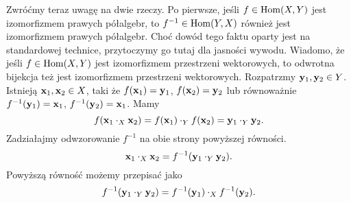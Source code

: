 \documentclass[a4paper,11pt]{article}
\begin{document}
Zwróćmy teraz uwagę na dwie rzeczy. Po pierwsze, jeśli $f \in \mathrm{Hom}( X, Y )$ jest izomorfizmem prawych półalgebr, to $f^{ -1 } \in \mathrm{Hom}( Y, X )$ również jest izomorfizmem prawych półalgebr. Choć dowód tego faktu oparty jest na standardowej technice, przytoczymy go tutaj dla jasności wywodu. Wiadomo, że jeśli $f \in \mathrm{Hom}( X, Y )$ jest izomorfizmem przestrzeni wektorowych, to odwrotna bijekcja też jest izomorfizmem przestrzeni wektorowych. Rozpatrzmy $\mathbf{y}_{ 1 }, \mathbf{y}_{ 2 } \in Y$. Istnieją $\mathbf{x}_{ 1 }, \mathbf{x}_{ 2 } \in X$, taki że $f( \mathbf{x}_{ 1 } ) = \mathbf{y}_{ 1 }$, $f( \mathbf{x} _{ 2 } ) = \mathbf{y}_{ 2 }$ lub równoważnie $f^{ -1 }( \mathbf{y}_{ 1 } ) = \mathbf{x}_{ 1 }$, $f^{ -1 }( \mathbf{y}_{ 2 } ) = \mathbf{x}_{ 1 }$. Mamy
\begin{equation}
  \label{eq:Wojtynski-69}
  f( \mathbf{x}_{ 1 } \cdot_{ X } \mathbf{x}_{ 2 } ) =
  f( \mathbf{x}_{ 1 } ) \cdot_{ Y } f( \mathbf{x}_{ 2 } ) =
  \mathbf{y}_{ 1 } \cdot_{ Y } \mathbf{y}_{ 2 }.
\end{equation}
Zadziałajmy odwzorowanie $f^{ -1 }$ na obie strony powyższej równości.
\begin{equation}
  \label{eq:Wojtynski-70}
  \mathbf{x}_{ 1 } \cdot_{ X } \mathbf{x}_{ 2 } =
  f^{ -1 }( \mathbf{y}_{ 1 } \cdot_{ Y } \mathbf{y}_{ 2 } ).
\end{equation}
Powyższą równość możemy przepisać jako
\begin{equation}
  \label{eq:Wojtynski-71}
  f^{ -1 }( \mathbf{y}_{ 1 } \cdot_{ Y } \mathbf{y}_{ 2 } ) =
  f^{ -1 }( \mathbf{y}_{ 1 } ) \cdot_{ X } f^{ -1 }( \mathbf{y}_{ 2 } ).
\end{equation}
\end{document}
